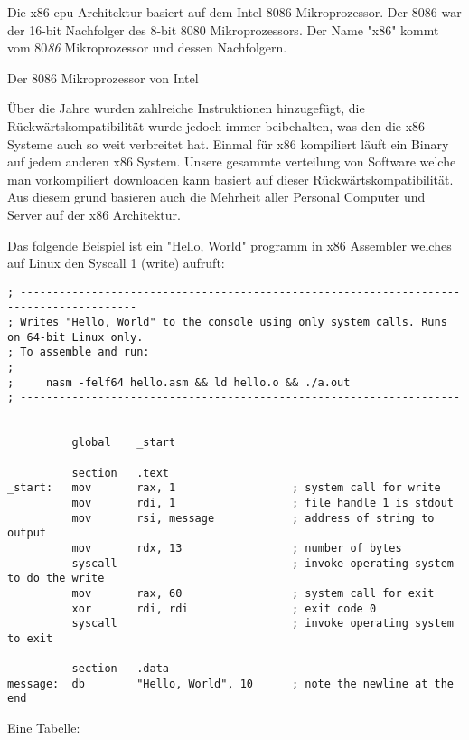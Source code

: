 Die x86 \acrshort{cpu} Architektur basiert auf dem Intel 8086 Mikroprozessor. \cite{Wikipediax86}
Der 8086 war der 16-bit Nachfolger des 8-bit 8080 Mikroprozessors.
Der Name "x86" kommt vom 80{\it 86} Mikroprozessor und dessen Nachfolgern.

    {Der 8086 Mikroprozessor von Intel}

Über die Jahre wurden zahlreiche Instruktionen hinzugefügt, die 
Rückwärtskompatibilität wurde jedoch immer beibehalten, was den die x86 
Systeme auch so weit verbreitet hat. Einmal für x86 kompiliert läuft ein
Binary auf jedem anderen x86 System. Unsere gesammte verteilung von 
Software welche man vorkompiliert downloaden kann basiert auf dieser 
Rückwärtskompatibilität. Aus diesem grund basieren auch die Mehrheit aller
Personal Computer und Server auf der x86 Architektur.



Das folgende Beispiel ist ein "Hello, World" programm in x86 Assembler 
welches auf Linux den Syscall 1 (write) aufruft:

\begin{verbatim}
; ----------------------------------------------------------------------------------------
; Writes "Hello, World" to the console using only system calls. Runs on 64-bit Linux only.
; To assemble and run:
;
;     nasm -felf64 hello.asm && ld hello.o && ./a.out
; ----------------------------------------------------------------------------------------

          global    _start

          section   .text
_start:   mov       rax, 1                  ; system call for write
          mov       rdi, 1                  ; file handle 1 is stdout
          mov       rsi, message            ; address of string to output
          mov       rdx, 13                 ; number of bytes
          syscall                           ; invoke operating system to do the write
          mov       rax, 60                 ; system call for exit
          xor       rdi, rdi                ; exit code 0
          syscall                           ; invoke operating system to exit

          section   .data
message:  db        "Hello, World", 10      ; note the newline at the end
\end{verbatim}


Eine Tabelle:


